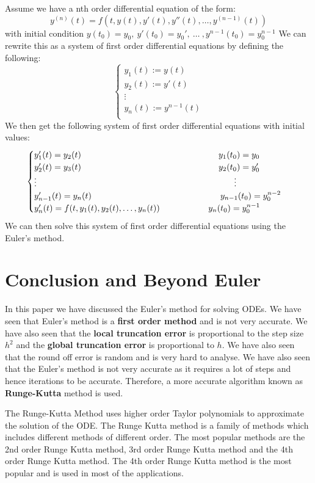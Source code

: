 \documentclass[11pt,a4paper]{amsart}
\begin{document}
Assume we have a nth order differential equation of the form:
$$y^{(n)}(t) = f(t, y(t), y'(t), y''(t), \ldots, y^{(n-1)}(t))$$
with initial condition $y(t_0) = y_0, \ y'(t_0) = y_0' , \  \ldots \  ,y^{n-1}(t_0) = y_{0}^{n-1}$ 
We can rewrite this as a system of first order differential equations by defining the following:
$$\begin{cases}
y_1(t) := y(t)\\
y_2(t) := y'(t)\\
\vdots\\
y_n(t) := y^{n-1}(t)\\
\end{cases}$$
We then get the following system of first order differential equations with initial values:
$$\begin{cases}
y_1'(t) = y_2(t)\hspace{160px} y_1(t_0) = y_0\\
y_2'(t) = y_3(t) \hspace{160px} y_2(t_0) = y'_0\\
\vdots \hspace{230px} \vdots\\
y_{n-1}'(t) = y_n(t) \hspace{150px} y_{n-1}(t_0) = y^{n-2}_0\\
y_n'(t) = f(t, y_1(t), y_2(t), \ldots, y_n(t)) \ \ \ \ \ \ \ \ \ \ \ \ \ \ \ \ \ y_{n}(t_0) = y^{n-1}_0\\
\end{cases}$$
We can then solve this system of first order differential equations using the Euler's method.
\section{Conclusion and Beyond Euler}
In this paper we have discussed the Euler's method for solving ODEs. We have seen that Euler's method is a \textbf{first order method} and is not very accurate. We have also seen that the {\bf local truncation error} is proportional to the step size $h^2$ and the {\bf global truncation error} is proportional to $h$. We have also seen that the round off error is random and is very hard to analyse. We have also seen that the Euler's method is not very accurate as it requires a lot of steps and hence iterations to be accurate. Therefore, a more accurate algorithm known as {\bf Runge-Kutta} method is used.

The Runge-Kutta Method uses higher order Taylor polynomials to approximate the solution of the ODE\cite{buchanan, burden, polking}. The Runge Kutta method is a family of methods which includes different methods of different order. The most popular methods are the 2nd order Runge Kutta method, 3rd order Runge Kutta method and the 4th order Runge Kutta method. The 4th order Runge Kutta method is the most popular and is used in most of the applications. 
\end{document}

